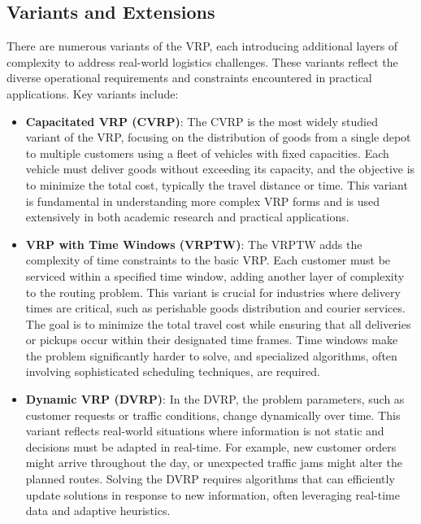 \documentclass[
]{article}
\begin{document}
    \subsection{Variants and Extensions}\label{subsec:variants-and-extensions}
    There are numerous variants of the VRP, each introducing additional layers of complexity to address real-world logistics challenges. These variants reflect the diverse operational requirements and constraints encountered in practical applications. Key variants include:


    \begin{itemize}
        \item \textbf{Capacitated VRP (CVRP)}:
        The CVRP is the most widely studied variant of the VRP, focusing on the distribution of goods from a single depot to multiple customers using a fleet of vehicles with fixed capacities. Each vehicle must deliver goods without exceeding its capacity, and the objective is to minimize the total cost, typically the travel distance or time. This variant is fundamental in understanding more complex VRP forms and is used extensively in both academic research and practical applications.

        \item \textbf{VRP with Time Windows (VRPTW)}:
        The VRPTW adds the complexity of time constraints to the basic VRP. Each customer must be serviced within a specified time window, adding another layer of complexity to the routing problem. This variant is crucial for industries where delivery times are critical, such as perishable goods distribution and courier services. The goal is to minimize the total travel cost while ensuring that all deliveries or pickups occur within their designated time frames. Time windows make the problem significantly harder to solve, and specialized algorithms, often involving sophisticated scheduling techniques, are required.

        \item \textbf{Dynamic VRP (DVRP)}:
        In the DVRP, the problem parameters, such as customer requests or traffic conditions, change dynamically over time. This variant reflects real-world situations where information is not static and decisions must be adapted in real-time. For example, new customer orders might arrive throughout the day, or unexpected traffic jams might alter the planned routes. Solving the DVRP requires algorithms that can efficiently update solutions in response to new information, often leveraging real-time data and adaptive heuristics.


\end{itemize}
\end{document}
